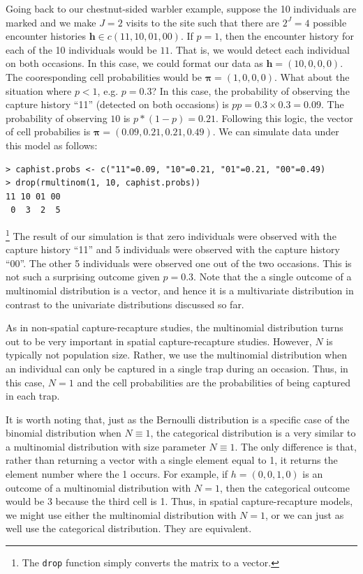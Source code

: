 Going back to our
chestnut-sided warbler example, suppose the 10 individuals are marked
and we make $J=2$ visits to the site such that there are $2^J = 4$ possible encounter
histories $\mathbf{h} \in c(11, 10, 01, 00)$. If $p=1$, then the
encounter history for each of the 10 individuals would be $11$. That
is, we would detect each individual on both occasions. In this case,
we could format our data as $\mathbf{h} = (10, 0, 0, 0)$. The
cooresponding cell probabilities would be $\bm{\pi} = (1, 0, 0,
0)$. What about the situation where $p<1$, e.g. $p=0.3$? In this case, the
probability of observing the capture history ``11'' (detected on both
occasions) is $pp = 0.3 \times 0.3 = 0.09$. The probability of
observing $10$ is $p*(1-p) = 0.21$. Following this logic, the vector
of cell probabilies is $\bm{\pi} = (0.09, 0.21, 0.21, 0.49)$. We can
simulate data under this model as follows:
\begin{verbatim}
> caphist.probs <- c("11"=0.09, "10"=0.21, "01"=0.21, "00"=0.49)
> drop(rmultinom(1, 10, caphist.probs))
11 10 01 00
 0  3  2  5
\end{verbatim}\footnote{The \verb+drop+ function simply converts the matrix to a vector.}
The
result of our simulation is that zero individuals were observed with
the capture history ``11'' and 5 individuals were observed with the
capture history ``00''. The other 5 individuals were observed one out
of the two occasions. This is not such a surprising outcome given
$p=0.3$. Note that the a single outcome of a multinomial distribution
is a vector, and hence it is a multivariate distribution in contrast
to the univariate distributions discussed so far.

As in non-spatial capture-recapture studies, the multinomial
distribution turns out to be very important in spatial
capture-recapture studies. However, $N$ is typically not population
size. Rather, we use the multinomial distribution when an individual
can only be captured in a single trap during an occasion. Thus, in
this case, $N=1$ and the cell probabilities are the probabilities of
being captured in each trap.

It is worth noting that, just as the Bernoulli distribution is a specific case of the binomial
distribution when $N \equiv 1$, the categorical distribution is a very
similar to a multinomial distribution with size parameter
$N\equiv1$. The only difference is that, rather than returning a
vector with a single element equal to 1, it returns the element number
where the 1 occurs. For example, if $h=(0,0,1,0)$ is an outcome of a
multinomial distribution with $N=1$, then the categorical outcome
would be 3 because the third cell is 1. Thus, in spatial
capture-recapture models, we might use either the multinomial
distribution with $N=1$, or we can just as well use the categorical
distribution. They are equivalent.


